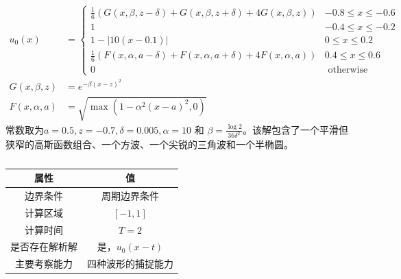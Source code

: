 \documentclass{book}
\begin{document}
\begin{example}
    \begin{equation}
        \begin{aligned}
            u_{0}(x)        & =\begin{cases}
                                   \frac{1}{6}(G(x, \beta, z-\delta)+G(x, \beta, z+\delta)+4 G(x, \beta, z))    & -0.8 \leq x \leq-0.6 \\
                                   1                                                                            & -0.4 \leq x \leq-0.2 \\
                                   1-|10(x-0.1)|                                                                & 0 \leq x \leq 0.2    \\
                                   \frac{1}{6}(F(x, \alpha, a-\delta)+F(x, \alpha, a+\delta)+4 F(x, \alpha, a)) & 0.4 \leq x \leq 0.6  \\
                                   0                                                                            & \text { otherwise }
                               \end{cases} \\
            G(x, \beta, z)  & =e^{-\beta(x-z)^{2}}                                                                                 \\
            F(x, \alpha, a) & =\sqrt{\max \left(1-\alpha^{2}(x-a)^{2}, 0\right)}
        \end{aligned}
    \end{equation}
    常数取为$a=0.5, z=-0.7, \delta=0.005, \alpha=10$ 和 $\beta=\frac{\log 2}{36 \delta^{2}}$。该解包含了一个平滑但狭窄的高斯函数组合、一个方波、一个尖锐的三角波和一个半椭圆。

    \begin{table}[htbp]
        \centering
        \label{table:}
        \caption{}
        \begin{tabular}{cc}
            \toprule
            属性           & 值                 \\
            \midrule
            边界条件       & 周期边界条件       \\
            计算区域       & $[-1,1]$           \\
            计算时间       & $T=2$              \\
            是否存在解析解 & 是，$u_0(x-t)$     \\
            主要考察能力   & 四种波形的捕捉能力 \\
            \bottomrule
        \end{tabular}
    \end{table}
\end{example}
\end{document}
